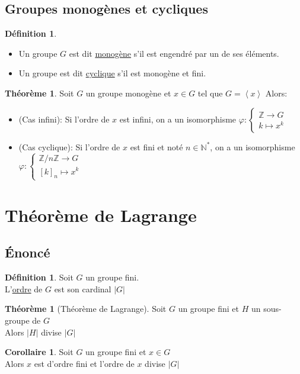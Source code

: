\documentclass[10pt,a4paper]{article}
\theoremstyle{definition}
\newtheorem{theorem}[proposition]{Théorème}
\newtheorem{corollaire}[proposition]{Corollaire}
\newtheorem{definition}[proposition]{Définition}
\begin{document}
\subsection{Groupes monogènes et cycliques}
\begin{definition}
\hfill
\begin{itemize}
\item Un groupe $G$ est dit \uline{monogène} s'il est engendré par un de ses éléments.
\item Un groupe est dit \uline{cyclique} s'il est monogène et fini.
\end{itemize}
\end{definition}
\begin{theorem}
Soit $G$ un groupe monogène et $x \in G$ tel que $G = \left<x\right>$
Alors:
\begin{itemize}
\item (Cas infini): Si l'ordre de $x$ est infini, on a un isomorphisme $\varphi: \begin{cases}
\mathbb{Z} \to G \\
k \mapsto x^k
\end{cases}$
\item (Cas cyclique): Si l'ordre de $x$ est fini et noté $n \in \mathbb{N}^*$, on a un isomorphisme $\varphi: \begin{cases}
\mathbb{Z}/n\mathbb{Z} \to G \\
[k]_n \mapsto x^k
\end{cases}$
\end{itemize}
\end{theorem}

\section{Théorème de Lagrange}
\subsection{Énoncé}
\begin{definition}
Soit $G$ un groupe fini. \\
L'\uline{ordre} de $G$ est son cardinal $|G|$
\end{definition}
\begin{theorem}[Théorème de Lagrange]
Soit $G$ un groupe fini et $H$ un sous-groupe de $G$ \\
Alors $|H|$ divise $|G|$
\end{theorem}
\begin{corollaire}
Soit $G$ un groupe fini et $x \in G$ \\
Alors $x$ est d'ordre fini et l'ordre de $x$ divise $|G|$
\end{corollaire}
\end{document}
